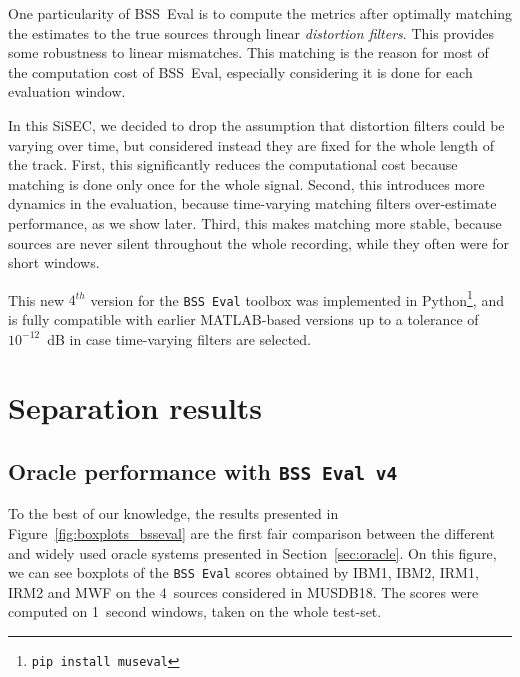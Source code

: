 \documentclass{llncs}
\begin{document}
One particularity of BSS~Eval is to compute the metrics after optimally matching the estimates to the true sources through linear \textit{distortion filters}. This provides some robustness to linear mismatches. This matching is the reason for most of the computation cost of BSS~Eval, especially considering it is done for each evaluation window.

In this SiSEC, we decided to drop the assumption that distortion filters could be varying over time, but considered instead they are fixed for the whole length of the track. First, this significantly reduces the computational cost because matching is done only once for the whole signal. Second, this introduces more dynamics in the evaluation, because time-varying matching filters over-estimate performance, as we show later. Third, this makes matching more stable, because sources are never silent throughout the whole recording, while they often were for short windows.

This new $4^{th}$ version for the \texttt{BSS~Eval} toolbox was implemented in Python\footnote{\texttt{pip install museval}}, and is fully compatible with earlier MATLAB-based versions up to a tolerance of $10^{-12}$~dB in case time-varying filters are selected.

\section{Separation results}
\subsection{Oracle performance with \texttt{BSS Eval v4}}
\label{ssec:bsseval-results}

To the best of our knowledge, the results presented in Figure~\ref{fig:boxplots_bsseval} are the first fair comparison between the different and widely used oracle systems presented in Section~\ref{sec:oracle}. On this figure, we can see boxplots of the \texttt{BSS~Eval} scores obtained by IBM1, IBM2, IRM1, IRM2 and MWF on the $4$~sources considered in MUSDB18. The scores were computed on 1~second windows, taken on the whole test-set.
\end{document}
